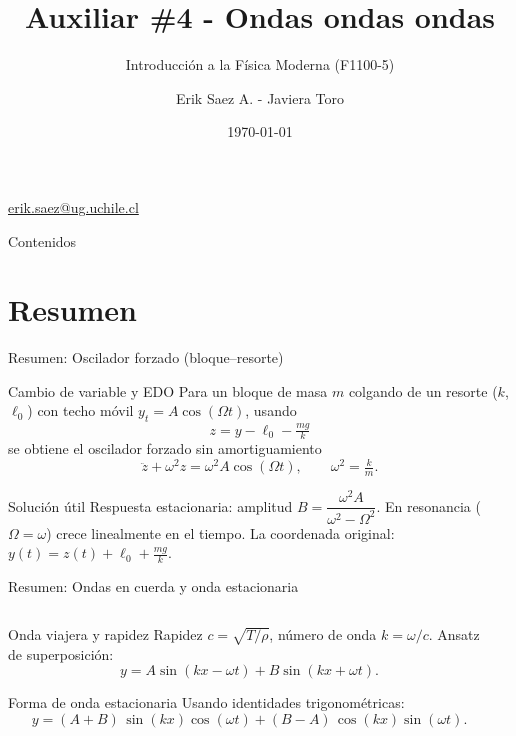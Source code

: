 \documentclass[
    10pt,
    aspectratio=169,
    xcolor={dvipsnames},
    spanish,
    ]{beamer}
\title[Auxiliar \#4 - Ondas ondas ondas]{\bfseries Auxiliar \#4 - Ondas ondas ondas}
\subtitle{Introducción a la Física Moderna (F1100-5)}
\author[Erik Saez A.]{Erik Saez A. - Javiera Toro}
\institute[UChile]{Departamento de Ingeniería Eléctrica \\ Universidad de Chile}
\date{\today}
\begin{document}
\begin{frame}
  \titlepage
  \centering
   \href{mailto:erik.saez@ug.uchile.cl}{erik.saez@ug.uchile.cl} \hspace{.2cm}
\end{frame}

\begin{frame}{Contenidos}
  \tableofcontents
\end{frame}

\section{Resumen}

\begin{frame}{Resumen: Oscilador forzado (bloque–resorte)}
  \footnotesize
  \begin{block}{Cambio de variable y EDO}
  Para un bloque de masa $m$ colgando de un resorte ($k$, $\ell_0$) con techo móvil $y_t=A\cos(\Omega t)$, usando
  \[ z= y-\ell_0-\tfrac{mg}{k} \]
  \vspace{-6pt}
    se obtiene el oscilador forzado sin amortiguamiento
    \[ \ddot z + \omega^2 z = \omega^2 A\cos(\Omega t),\qquad \omega^2=\tfrac{k}{m}. \]
  \end{block}
  \begin{block}{Solución útil}
    Respuesta estacionaria: amplitud \( B=\dfrac{\omega^2 A}{\omega^2-\Omega^2} \). En resonancia ($\Omega=\omega$) crece linealmente en el tiempo. La coordenada original: \( y(t)=z(t)+\ell_0+\tfrac{mg}{k} \).
  \end{block}
\end{frame}

\begin{frame}{Resumen: Ondas en cuerda y onda estacionaria}
  \footnotesize
  \begin{columns}[T]
    \begin{column}{0.57\textwidth}
      \begin{block}{Onda viajera y rapidez}
        Rapidez \( c=\sqrt{T/\rho} \), número de onda \( k=\omega/c \). Ansatz de superposición:
        \[ y=A\sin(kx-\omega t)+B\sin(kx+\omega t). \]
      \end{block}
      \begin{block}{Forma de onda estacionaria}
        Usando identidades trigonométricas:
        \[
          y=(A+B)\,\sin(kx)\cos(\omega t)+(B-A)\,\cos(kx)\sin(\omega t).
        \]
      \end{block}
    \end{column}
    \begin{column}{0.4\textwidth}
    \end{column}
  \end{columns}
\end{frame}
\end{document}
